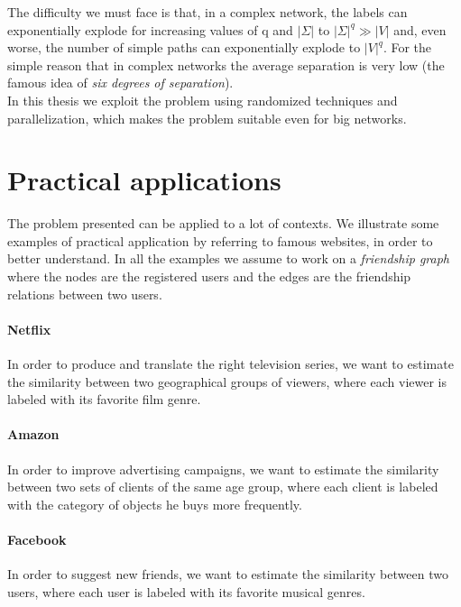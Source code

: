The difficulty we must face is that, in a complex network, the labels can exponentially explode for increasing values of q and $|\Sigma|$ to $|\Sigma|^{q} \gg |V|$ and, even worse, the number of simple paths can exponentially explode to $|V|^{q}$. For the simple reason that in complex networks the average separation is very low (the famous idea of \textit{six degrees of separation}).\\

In this thesis we exploit the problem using randomized techniques and parallelization, which makes the problem suitable even for big networks. 
\section{Practical applications}

The problem presented can be applied to a lot of contexts. 
We illustrate some examples of practical application by referring to famous websites,
in order to better understand.
In all the examples we assume to work on a \textit{friendship graph} where the nodes are the registered users and 
the edges are the friendship relations between two users.

\paragraph*{Netflix} In order to produce and translate the right television series, we want to estimate the similarity between two geographical groups of viewers, where each viewer is labeled with its favorite film genre.
  
\paragraph*{Amazon} In order to improve advertising campaigns, we want to estimate the similarity between two sets of clients of the same age group, where each client is labeled with the category of objects he buys more frequently.

\paragraph*{Facebook} In order to suggest new friends, we want to estimate the similarity between two users, where each user is labeled with its favorite musical genres.  


